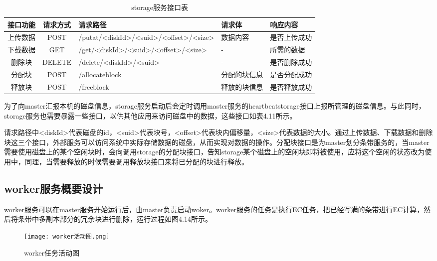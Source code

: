 \begin{table}[h]
    \centering
    \caption{storage服务接口表}
    \begin{tabular}{ccp{4cm}p{2cm}p{3cm}}
      \toprule
      接口功能   & 请求方式    & 请求路径     & 请求体    & 响应内容                     \\
      \midrule
      上传数据      & POST   & /putat/<diskId>/<suid>\newline/<offset>/<size> & 数据内容      & 是否上传成功\\
      下载数据      & GET    & /get/<diskId>\newline/<suid>/<offset>/<size>   & -            & 所需的数据\\
      删除块        & DELETE & /delete/<diskId>/<suid>                        & -            & 是否删除成功\\
      分配块        & POST   & /allocateblock                                 & 分配的块信息  & 是否分配成功\\
      释放块        & POST   & /freeblock                                     & 释放的块信息  & 是否释放成功\\
      \bottomrule
    \end{tabular}
\end{table}	

为了向master汇报本机的磁盘信息，storage服务启动后会定时调用master服务的heartbeatstorage接口上报所管理的磁盘信息。与此同时，storage服务也需要暴露一些接口，以供其他应用来访问磁盘中的数据，这些接口如表4.11所示。

请求路径中<diskId>代表磁盘的id，<suid>代表块号，<offset>代表块内偏移量，<size>代表数据的大小。通过上传数据、下载数据和删除块这三个接口，外部服务可以访问系统中实际存储数据的磁盘，从而实现对数据的操作。分配块接口是为master划分条带服务的，当master需要使用磁盘上的某个空闲块时，会向调用storage的分配块接口，告知storage某个磁盘上的空闲块即将被使用，应将这个空闲的状态改为使用中，同理，当需要释放的时候需要调用释放块接口来将已分配的块进行释放。

\subsection{worker服务概要设计}
worker服务可以在master服务开始运行后，由master负责启动woker。worker服务的任务是执行EC任务，把已经写满的条带进行EC计算，然后将条带中多副本部分的冗余块进行删除，运行过程如图4.14所示。

\begin{figure}[h]
  \centering
  \texttt{[image: worker活动图.png]}
  \caption{worker任务活动图}
\end{figure}

